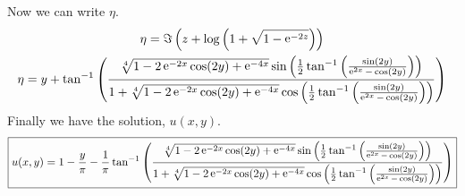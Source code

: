 {\begin{Solution}
\[  \]
  Now we can write $\eta$.
  \begin{gather*}
    \eta = \Im \left( z + \log \left( 1 + \sqrt{ 1 - \mathop{\mathrm{e}}\nolimits^{-2 z} } \right) \right) \\
    \eta = y + \tan^{-1} \left(
      \frac{ \sqrt[4]{ 1 - 2 \mathop{\mathrm{e}}\nolimits^{-2 x} \cos(2 y) + \mathop{\mathrm{e}}\nolimits^{-4 x} }
        \sin \left( \frac{1}{2} \tan^{-1} \left( 
            \frac{ \sin(2 y) }{ \mathop{\mathrm{e}}\nolimits^{2x} - \cos(2y) } \right) \right) }
      { 1 + \sqrt[4]{ 1 - 2 \mathop{\mathrm{e}}\nolimits^{-2 x} \cos(2 y) + \mathop{\mathrm{e}}\nolimits^{-4 x} }
        \cos \left( \frac{1}{2} \tan^{-1} \left( 
            \frac{ \sin(2 y) }{ \mathop{\mathrm{e}}\nolimits^{2x} - \cos(2y) } \right) \right) } \right)
  \end{gather*}
  Finally we have the solution, $u(x,y)$.
  \[
  \boxed{
    u(x,y) = 1 - \frac{y}{\pi} - \frac{1}{\pi} \tan^{-1} \left(
      \frac{ \sqrt[4]{ 1 - 2 \mathop{\mathrm{e}}\nolimits^{-2 x} \cos(2 y) + \mathop{\mathrm{e}}\nolimits^{-4 x} }
        \sin \left( \frac{1}{2} \tan^{-1} \left( 
            \frac{ \sin(2 y) }{ \mathop{\mathrm{e}}\nolimits^{2x} - \cos(2y) } \right) \right) }
      { 1 + \sqrt[4]{ 1 - 2 \mathop{\mathrm{e}}\nolimits^{-2 x} \cos(2 y) + \mathop{\mathrm{e}}\nolimits^{-4 x} }
        \cos \left( \frac{1}{2} \tan^{-1} \left( 
            \frac{ \sin(2 y) }{ \mathop{\mathrm{e}}\nolimits^{2x} - \cos(2y) } \right) \right) } \right)
    }
  \]
\end{Solution}









\raggedbottom
}
